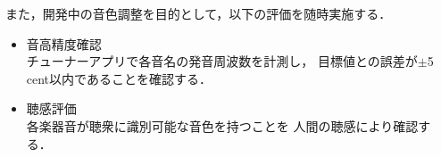 また，開発中の音色調整を目的として，以下の評価を随時実施する．

\begin{itemize}
  \item 音高精度確認 \\
  チューナーアプリで各音名の発音周波数を計測し，
  目標値との誤差が$\pm$5\,cent以内であることを確認する．

  \item 聴感評価 \\
  各楽器音が聴衆に識別可能な音色を持つことを
  人間の聴感により確認する．
\end{itemize}